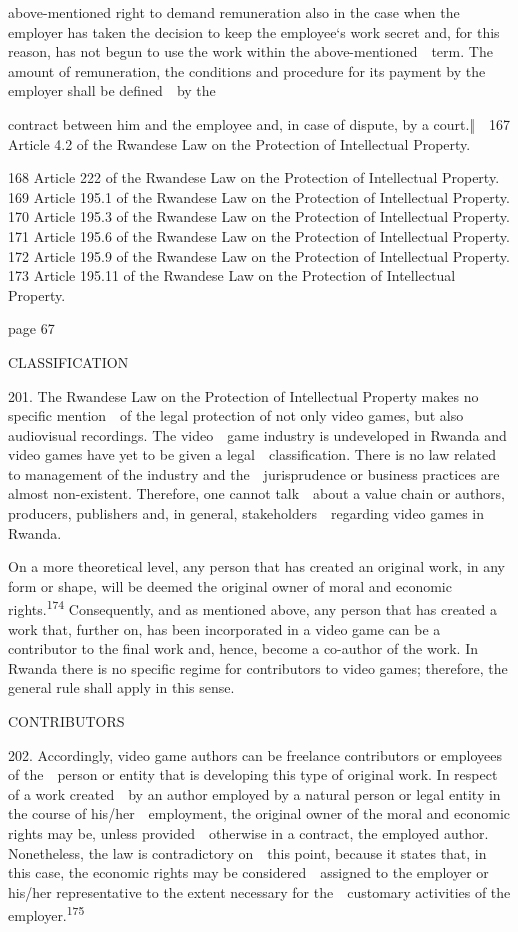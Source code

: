 \documentclass[
]{article}
\begin{document}
{above-mentioned right to demand remuneration also in the case when the
employer has taken the decision to keep }{the employee`s work secret
and, for this reason, has not beg}{un to use the work within the
above-mentioned~~term. The amount of remuneration, the conditions and
procedure for its payment by the employer shall be defined~~by the}

{contract between him and the employee and, in case of dispute, by a
court.‖}{~~}{167 }{Article 4.2 of the Rwandese }{Law on the Protection
of Intellectual Property}{.}

{168 }{Article 222 of the Rwandese }{Law on the Protection of
Intellectual Property}{. }{169 }{Article 195.1 of the Rwandese }{Law on
the Protection of Intellectual Property}{. }{170 }{Article 195.3 of the
Rwandese }{Law on the Protection of Intellectual Property}{. }{171
}{Article 195.6 of the Rwandese }{Law on the Protection of Intellectual
Property}{. }{172 }{Article 195.9 of the Rwandese }{Law on the
Protection of Intellectual Property}{. }{173 }{Article 195.11 of the
Rwandese }{Law on the Protection of Intellectual Property}{.}

{page 67}

{CLASSIFICATION}

{201. }{The Rwandese }{Law on the Protection of Intellectual Property
}{makes no specific mention~~of the legal protection of not only video
games, but also audiovisual recordings. The video~~game industry is
undeveloped in Rwanda and video games have yet to be given a
legal~~classification. There is no law related to management of the
industry and the~~jurisprudence or business practices are almost
non-existent. Therefore, one cannot talk~~about a value chain or
authors, producers, publishers and, in general, stakeholders~~regarding
video games in Rwanda.}

{On a more theoretical level, any person that has created an original
work, in any form or shape, will be deemed the }{original owner of moral
and economic rights.}\textsuperscript{{174 }}{Consequently, and as
mentioned above, any person that has created a work that, further on,
has been incorporated in a video game can be a contributor to the final
work and, hence, become a co-author of the work. In Rwanda there is no
specific regime for contributors to video games; therefore, the general
rule shall apply in this sense.}

{CONTRIBUTORS}

{202. }{Accordingly, video game authors can be freelance contributors or
employees of the~~person or entity that is developing this type of
original work. In respect of a work created~~by an author employed by a
natural person or legal entity in the course of his/her~~employment, the
original owner of the moral and economic rights may be, unless
provided~~otherwise in a contract, the employed author. Nonetheless, the
law is contradictory on~~this point, because it states that, in this
case, the economic rights may be considered~~assigned to the employer or
his/her representative to the extent necessary for the~~customary
activities of the employer.}\textsuperscript{{175}}
\end{document}
